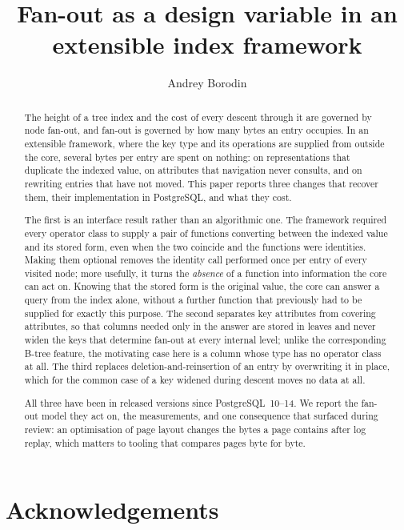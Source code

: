 \documentclass[11pt, a4paper]{article}
\title{Fan-out as a design variable in an extensible index framework}
\author{Andrey Borodin}
\date{}
\begin{document}
\maketitle

\begin{abstract}
The height of a tree index and the cost of every descent through it are governed
by node fan-out, and fan-out is governed by how many bytes an entry occupies.
In an extensible framework, where the key type and its operations are supplied
from outside the core, several bytes per entry are spent on nothing: on
representations that duplicate the indexed value, on attributes that navigation
never consults, and on rewriting entries that have not moved. This paper reports
three changes that recover them, their implementation in PostgreSQL, and what
they cost.

The first is an interface result rather than an algorithmic one. The framework
required every operator class to supply a pair of functions converting between
the indexed value and its stored form, even when the two coincide and the
functions were identities. Making them optional removes the identity call
performed once per entry of every visited node; more usefully, it turns the
\emph{absence} of a function into information the core can act on. Knowing that
the stored form is the original value, the core can answer a query from the
index alone, without a further function that previously had to be supplied for
exactly this purpose. The second separates key attributes from covering
attributes, so that columns needed only in the answer are stored in leaves and
never widen the keys that determine fan-out at every internal level; unlike the
corresponding B-tree feature, the motivating case here is a column whose type has
no operator class at all. The third replaces deletion-and-reinsertion of an entry
by overwriting it in place, which for the common case of a key widened during
descent moves no data at all.

All three have been in released versions since PostgreSQL~10--14. We report the
fan-out model they act on, the measurements, and one consequence that surfaced
during review: an optimisation of page layout changes the bytes a page contains
after log replay, which matters to tooling that compares pages byte for byte.
\end{abstract}



\section*{Acknowledgements}
\end{document}
